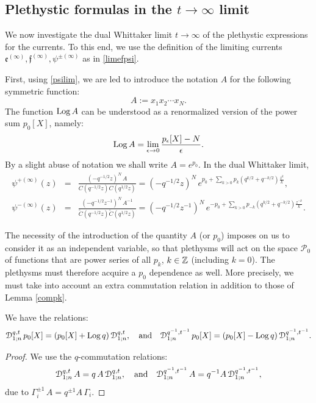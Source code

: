 \subsection{Plethystic formulas in the $t\to\infty$ limit}

We now investigate the dual Whittaker limit $t\to\infty$ of the plethystic expressions for the currents. To this end, we use the definition of the limiting currents
${\mathfrak e}^{(\infty)},{\mathfrak f}^{(\infty)},\psi^{\pm(\infty)}$ as in \eqref{limefpsi}.

First, using \eqref{psilim}, we are led to introduce the notation $A$ for the following symmetric function:
$$A:=x_1x_2\cdots x_N.$$
The function ${\rm Log}\, A$ can be understood as a renormalized version of the power sum $p_0[X]$, namely:
$${\rm Log}\, A= \lim_{\epsilon\to 0} \frac{p_\epsilon[X] -N}{\epsilon} .$$
By a slight abuse of notation we shall write $A=e^{p_0}$.
In the dual Whittaker limit,
\begin{eqnarray*}
\psi^{+(\infty)}(z)&=&\frac{(-q^{-1/2}z)^N\,  A}{C(q^{-1/2}z)C(q^{1/2}z)}=
(-q^{-1/2}z)^N\, e^{p_0+\sum_{k>0} p_k(q^{k/2}+q^{-k/2})\frac{z^k}{k}},\\
\psi^{-(\infty)}(z)&=&\frac{(-q^{-1/2}z^{-1})^N\,  A^{-1}}{{\widetilde C}(q^{-1/2}z){\widetilde C}(q^{1/2}z)}=
(-q^{-1/2}z^{-1})^N\, e^{-p_0+\sum_{k>0} p_{-k}(q^{k/2}+q^{-k/2})\frac{z^{-k}}{k}}.
\end{eqnarray*}

The necessity of the introduction of the quantity $A$ (or $p_0$) imposes on us to consider it as an independent
variable, so that plethysms will act on the space ${\mathcal P}_0$ of functions that are power series of all $p_k$, $k\in {\mathbb Z}$ (including $k=0$). The plethysms must therefore acquire a $p_0$ dependence as well.
More precisely, we must take into account an extra commutation relation in addition to those of Lemma \ref{compk}.
\begin{lemma}
We have the relations:
\begin{equation}
{\mathcal D}^{q,t}_{1;n}\, p_0[X]=(p_0[X]+{\rm Log}\, q)  \, {\mathcal D}^{q,t}_{1;n},\quad {\rm and}\quad 
{\mathcal D}^{q^{-1},t^{-1}}_{1;n}\, p_0[X]=(p_0[X]-{\rm Log}\, q)\, {\mathcal D}^{q^{-1},t^{-1}}_{1;n}.
\end{equation}
\end{lemma}
\begin{proof}
We use the $q$-commutation relations:
\begin{equation}
{\mathcal D}^{q,t}_{1;n}\, A=q \, A\, {\mathcal D}^{q,t}_{1;n},\quad {\rm and}\quad 
{\mathcal D}^{q^{-1},t^{-1}}_{1;n}\, A=q^{-1} A \, {\mathcal D}^{q^{-1},t^{-1}}_{1;n},
\end{equation}
due to $\Gamma_i^{\pm 1} \, A= q^{\pm 1} A \, \Gamma_i$.
\end{proof}

